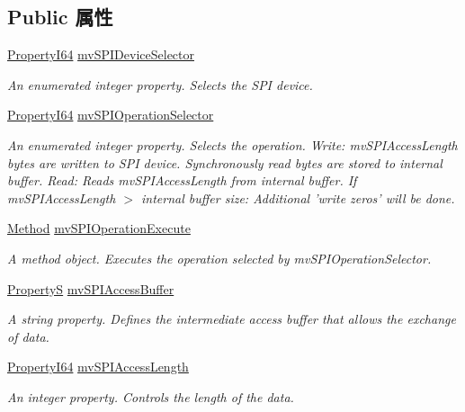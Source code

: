 \subsection*{Public 属性}
\begin{DoxyCompactItemize}
\item 
\hyperlink{group___common_interface_ga81749b2696755513663492664a18a893}{Property\+I64} \hyperlink{classmv_i_m_p_a_c_t_1_1acquire_1_1_gen_i_cam_1_1mv_s_p_i_control_ab66a5a78e13a79a3cd365c57ad77b56a}{mv\+S\+P\+I\+Device\+Selector}
\begin{DoxyCompactList}\small\item\em An enumerated integer property. Selects the S\+P\+I device. \end{DoxyCompactList}\item 
\hyperlink{group___common_interface_ga81749b2696755513663492664a18a893}{Property\+I64} \hyperlink{classmv_i_m_p_a_c_t_1_1acquire_1_1_gen_i_cam_1_1mv_s_p_i_control_acd7ac08de101ff82313c9f99066a18b9}{mv\+S\+P\+I\+Operation\+Selector}
\begin{DoxyCompactList}\small\item\em An enumerated integer property. Selects the operation. Write\+: mv\+S\+P\+I\+Access\+Length bytes are written to S\+P\+I device. Synchronously read bytes are stored to internal buffer. Read\+: Reads mv\+S\+P\+I\+Access\+Length from internal buffer. If mv\+S\+P\+I\+Access\+Length $>$ internal buffer size\+: Additional 'write zeros' will be done. \end{DoxyCompactList}\item 
\hyperlink{classmv_i_m_p_a_c_t_1_1acquire_1_1_method}{Method} \hyperlink{classmv_i_m_p_a_c_t_1_1acquire_1_1_gen_i_cam_1_1mv_s_p_i_control_ad30bb2d3142e194403bc35755ee10f5c}{mv\+S\+P\+I\+Operation\+Execute}
\begin{DoxyCompactList}\small\item\em A method object. Executes the operation selected by mv\+S\+P\+I\+Operation\+Selector. \end{DoxyCompactList}\item 
\hyperlink{classmv_i_m_p_a_c_t_1_1acquire_1_1_property_s}{Property\+S} \hyperlink{classmv_i_m_p_a_c_t_1_1acquire_1_1_gen_i_cam_1_1mv_s_p_i_control_a766fa7394efffd648bf5bbc3d6f54435}{mv\+S\+P\+I\+Access\+Buffer}
\begin{DoxyCompactList}\small\item\em A string property. Defines the intermediate access buffer that allows the exchange of data. \end{DoxyCompactList}\item 
\hyperlink{group___common_interface_ga81749b2696755513663492664a18a893}{Property\+I64} \hyperlink{classmv_i_m_p_a_c_t_1_1acquire_1_1_gen_i_cam_1_1mv_s_p_i_control_a6558bcdf2437ea8e15ffc043ee235053}{mv\+S\+P\+I\+Access\+Length}
\begin{DoxyCompactList}\small\item\em An integer property. Controls the length of the data. \end{DoxyCompactList}\end{DoxyCompactItemize}
